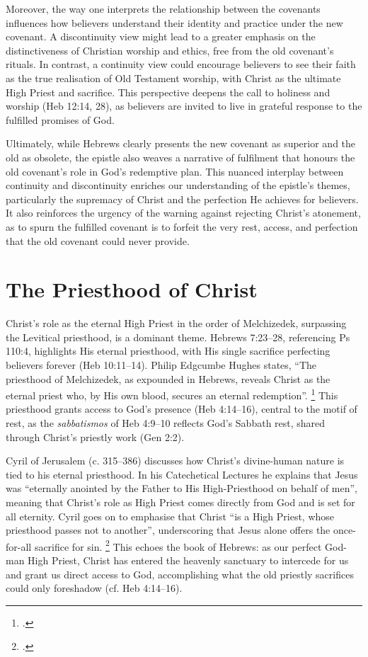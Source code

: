 \documentclass[12pt]{article}
\def\jesus{Yeshua}
\def\christ{the Messiah}
\def\Christ{The Messiah}
\def\jesus{Jesus}
\def\christ{Christ}
\def\Christ{Christ}
\begin{document}
Moreover, the way one interprets the relationship between the covenants
influences how believers understand their identity and practice under the new
covenant. A discontinuity view might lead to a greater emphasis on the
distinctiveness of Christian worship and ethics, free from the old covenant’s
rituals. In contrast, a continuity view could encourage believers to see their
faith as the true realisation of Old Testament worship, with \christ{} as the
ultimate High Priest and sacrifice. This perspective deepens the call to
holiness and worship (Heb 12:14, 28), as believers are invited to live in
grateful response to the fulfilled promises of God.

Ultimately, while Hebrews clearly presents the new covenant as superior and the
old as obsolete, the epistle also weaves a narrative of fulfilment that honours
the old covenant’s role in God’s redemptive plan.
%
This nuanced interplay between continuity and discontinuity enriches our
understanding of the epistle’s themes, particularly the supremacy of \christ{}
and the perfection He achieves for believers.
%
It also reinforces the urgency of the warning against rejecting \christ{}’s
atonement, as to spurn the fulfilled covenant is to forfeit the very rest,
access, and perfection that the old covenant could never provide.

\section{The Priesthood of \Christ{}}
\Christ{}’s role as the eternal High Priest in the order of Melchizedek,
surpassing the Levitical priesthood, is a dominant theme.
%
Hebrews 7:23--28, referencing Ps 110:4, highlights His eternal priesthood, with
His single sacrifice perfecting believers forever (Heb 10:11--14).
%
Philip Edgcumbe Hughes states, ``The
priesthood of Melchizedek, as expounded in Hebrews, reveals \christ{} as the
eternal priest who, by His own blood, secures an eternal redemption''.
\footcite[258]{Hughes1977}
This priesthood grants access to God’s presence (Heb 4:14--16),
central to the motif of rest, as the \emph{sabbatismos} of Heb 4:9--10
reflects God’s Sabbath rest, shared through \christ{}’s priestly work (Gen 2:2).

Cyril of Jerusalem (c. 315–386) discusses how \christ{}’s divine-human nature is
tied to his eternal priesthood. In his Catechetical Lectures he explains that
\jesus{} was ``eternally anointed by the Father to His High-Priesthood on behalf
of men'', meaning that \christ{}’s role as High Priest comes directly from God
and is set for all eternity.
%
Cyril goes on to emphasise that \christ{} ``is a High Priest, whose priesthood
passes not to another'', underscoring that \jesus{} alone offers the
once-for-all sacrifice for sin. \footcite[Lecture 12]{Cyril1894}
%
This echoes the book of Hebrews: as our perfect God-man High Priest, \christ{}
has entered the heavenly sanctuary to intercede for us and grant us direct
access to God, accomplishing what the old priestly sacrifices could only
foreshadow (cf.  Heb 4:14–16).
\end{document}
